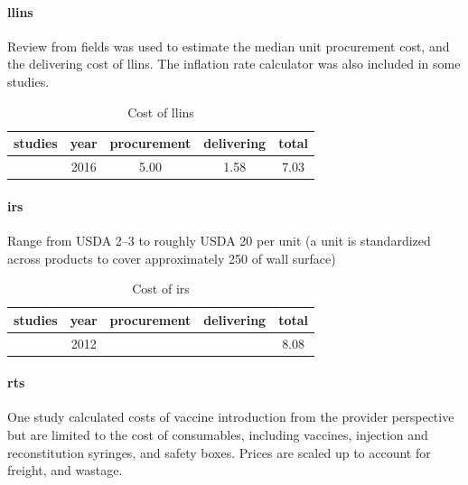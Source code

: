 \documentclass[a4paper, 12pt, twoside]{report}
\begin{document}
\paragraph{\texorpdfstring{\gls{llins}}{LLINs}}
Review from fields was used to estimate the median unit procurement cost, and the delivering cost of \gls{llins}.
The inflation rate calculator was also included in some studies\cite{Walker2016}.

\begin{table}[htpb]
	\centering
	\caption{Cost of \gls{llins}}
	\label{tab:cost_of_llins}
	\begin{tabular}{cSSSS}
		\toprule
		studies           & {year} & {procurement} & {delivering} & {total} \\
		\midrule
		\cite{Walker2016} & 2016   & 5.00          & 1.58         & 7.03    \\
		\bottomrule
	\end{tabular}
\end{table}

\paragraph{\texorpdfstring{\gls{irs}}{IRS}}
Range from USDA 2–3 to roughly USDA 20 per unit\cite{Oxborough2016}
(a unit is standardized across products to cover approximately 250 of wall surface)

\begin{table}[htpb]
	\centering
	\caption{Cost of \gls{irs}}
	\label{tab:cost_of_irs}
	\begin{tabular}{cSSSS}
		\toprule
		studies           & {year} & {procurement} & {delivering} & {total} \\
		\midrule
		\cite{Walker2016} & 2012   &               &              & 8.08    \\
		\bottomrule
	\end{tabular}
\end{table}


\paragraph{\texorpdfstring{\gls{rts}}{RTS}}%
\label{sub:rts}
One study\cite{Hay2004} calculated costs of vaccine introduction from the provider perspective but are limited to the cost of consumables, including vaccines, injection and reconstitution syringes, and safety boxes.
Prices are scaled up to account for freight\cite{Winskill2017a}, and wastage\cite{Hutton2006}.
\end{document}
